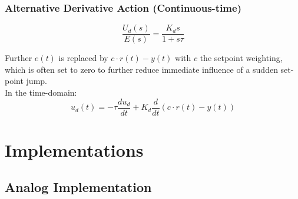 \begin{frame}
	\frametitle{Alternative Derivative Action (Continuous-time)}
	\begin{equation*}
		\frac{U_d(s)}{E(s)} = \frac{K_d s}{1+s\tau}
	\end{equation*}
	
	Further $e(t)$ is replaced by $c\cdot r(t)-y(t)$ with $c$ the setpoint weighting, which is often set to zero to further reduce immediate influence of a sudden set-point jump. \\
	\vspace{1em}
	In the time-domain:
	\begin{equation*}
		u_d(t) = -\tau\frac{du_d}{dt} + K_d \frac{d}{dt}(c\cdot r(t)-y(t))
	\end{equation*}
\end{frame}

\section{Implementations}

\subsection{Analog Implementation}

